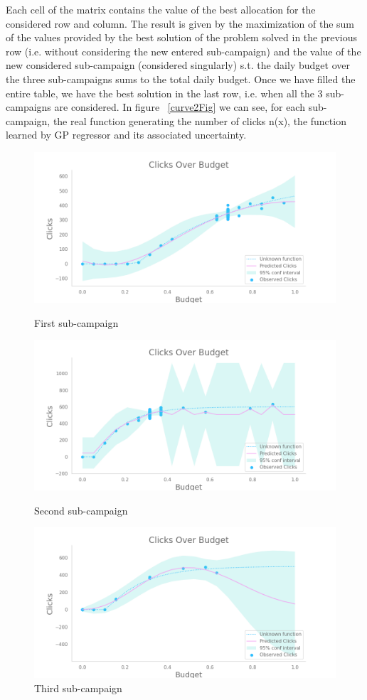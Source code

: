Each cell of the matrix contains the value of the best allocation for the considered row and column.
The result is given by the maximization of the sum of the values provided by the best solution of the problem solved in the previous row (i.e. without considering the new entered sub-campaign) and
the value of the new considered sub-campaign (considered singularly) s.t. the daily budget over the three sub-campaigns sums to the total daily budget.
Once we have filled the entire table, we have the best solution in the last row, i.e. when all the 3 sub-campaigns are considered.
In figure ~\ref{curve2Fig} we can see, for each sub-campaign, the real function generating the number of clicks n(x), the function learned by GP regressor and its associated uncertainty.
\begin{figure}[!htb]
    \centering

    \includegraphics[width=\linewidth]{images/part2_bidding_curve_subcamaign_0.png}
    \caption{First sub-campaign}
    \endminipage\hfill
    \includegraphics[width=\linewidth]{images/part2_bidding_curve_subcamaign_1.png}
    \caption{Second sub-campaign}
    \endminipage\hfill
    \includegraphics[width=\linewidth]{images/part2_bidding_curve_subcamaign_2.png}
    \caption{Third sub-campaign}
    \endminipage\hfill


\end{figure}
